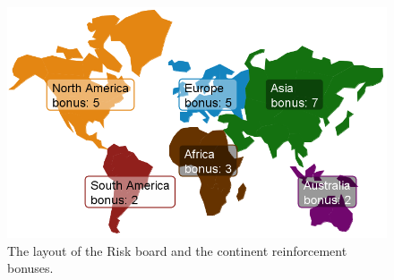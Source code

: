 \documentclass[letterpaper]{article}
\numberwithin{equation}{section}
\numberwithin{theorem}{section}
\numberwithin{lemma}{section}
\numberwithin{df}{section}
\begin{document}




\begin{figure}[t]
	\centering
	\includegraphics[scale=0.325]{figs/Conts.png}
	\caption{The layout of the Risk board and the continent reinforcement bonuses.}
	\label{fig:Conts}
\end{figure}
\end{document}
